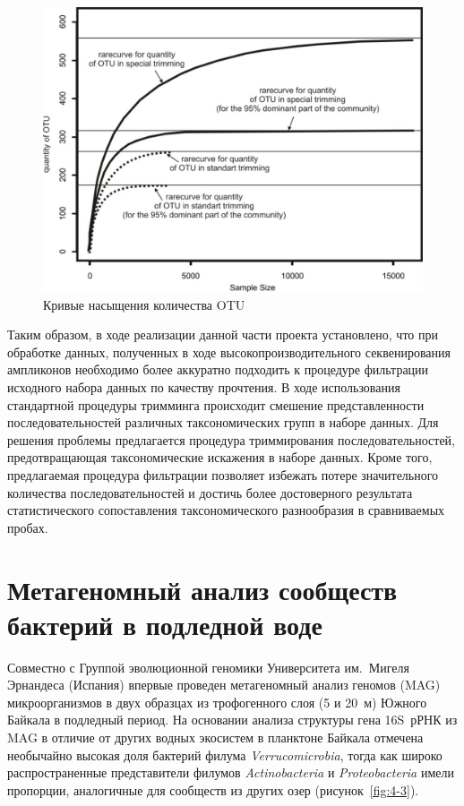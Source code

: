\documentclass[a4paper,12pt,openany,final]{extreport}
\def\oldcaption{} \let\oldcaption=\caption
\def\caption{\stepcounter{captionsnum}\oldcaption}
\begin{document}
\begin{figure}\centering
\includegraphics[width=0.6\linewidth]{media/image7.jpeg}

\caption{Кривые насыщения количества OTU}\label{fig:3-1}
\end{figure}

Таким образом, в ходе реализации данной части проекта установлено, что при обработке данных, полученных в ходе высокопроизводительного секвенирования ампликонов необходимо более аккуратно подходить к процедуре фильтрации исходного набора данных по качеству прочтения. В ходе использования стандартной процедуры тримминга происходит смешение представленности последовательностей различных таксономических групп в наборе данных. Для решения проблемы предлагается процедура триммирования последовательностей, предотвращающая таксономические искажения в наборе данных. Кроме того, предлагаемая процедура фильтрации позволяет избежать потере значительного количества последовательностей и достичь более достоверного результата статистического сопоставления таксономического разнообразия в сравниваемых пробах.

\chapter{Метагеномный анализ сообществ бактерий в подледной воде} \label{chap:3}

Совместно с Группой эволюционной геномики Университета им.~Мигеля Эрнандеса (Испания) впервые проведен метагеномный анализ геномов (MAG) микроорганизмов в двух образцах из трофогенного слоя (5 и 20~м) Южного Байкала в подледный период. На основании анализа структуры гена 16S~рРНК из MAG в отличие от других водных экосистем в планктоне Байкала отмечена необычайно высокая доля бактерий филума \emph{Verrucomicrobia}, тогда как широко распространенные представители филумов \emph{Actinobacteria} и \emph{Proteobacteria} имели пропорции, аналогичные для сообществ из других озер (рисунок~\ref{fig:4-3}).
\end{document}
